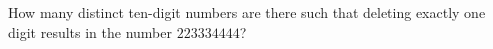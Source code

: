 How many distinct ten-digit numbers are there such that deleting exactly one digit results in the number $223334444$?

